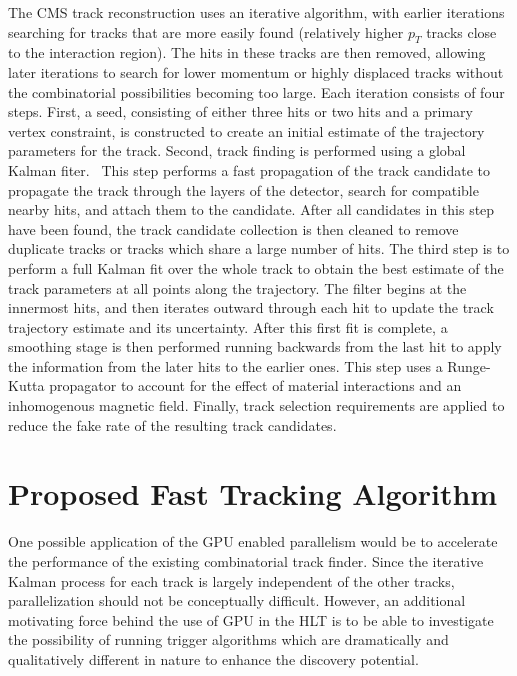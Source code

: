 \documentclass{JINST}
\begin{document}
The CMS track reconstruction uses an iterative algorithm, with earlier iterations searching for tracks that are more easily found 
(relatively higher $p_T$ tracks close to the interaction region). The hits in these tracks are then removed, allowing later iterations 
to search for lower momentum or highly displaced tracks without the combinatorial possibilities becoming too large. Each iteration 
consists of four steps. First, a seed, consisting of either three hits or two hits and a primary vertex constraint, is constructed 
to create an initial estimate of the trajectory parameters for the track. Second, track finding is performed using a global Kalman 
fiter.~\cite{Fruhwirth:1987fm} This step performs a fast propagation of the track candidate to propagate the track through the
 layers of the detector, search for compatible nearby hits, and attach them to the candidate. After all candidates in this step have
 been found, the track candidate collection is then cleaned to remove duplicate tracks or tracks which share a large number of hits. 
The third step is to perform a full Kalman fit over the whole track to obtain the best estimate of the track parameters at all points 
along the trajectory. The filter begins at the innermost hits, and then iterates outward through each hit to update the track trajectory 
estimate and its uncertainty. After this first fit is complete, a smoothing stage is then performed running backwards from the last hit 
to apply the information from the later hits to the earlier ones. This step uses a Runge-Kutta propagator to account for the effect of 
material interactions and an inhomogenous magnetic field. Finally, track selection requirements are applied to reduce the fake rate of the resulting track candidates.






\section{Proposed Fast Tracking Algorithm}

One possible application of the GPU enabled parallelism would be to
accelerate the performance of the existing combinatorial track finder.
Since the iterative Kalman process for each track is largely independent of the other tracks,
parallelization should not be conceptually difficult. However, an additional motivating 
force behind the use of GPU in the HLT is to be able to investigate the possibility of 
running trigger algorithms which are dramatically and qualitatively different in nature 
to enhance the discovery potential.
\end{document}
